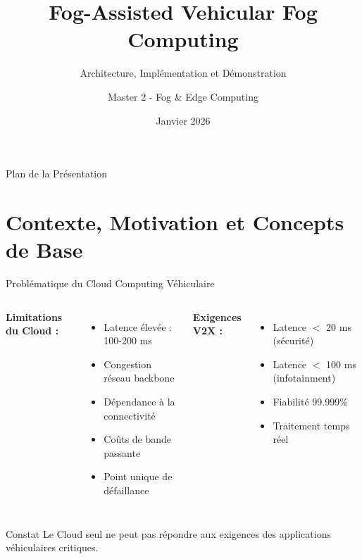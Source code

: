 ﻿\documentclass[aspectratio=169,11pt]{beamer}
\title[Fog-Assisted Vehicular Computing]{Fog-Assisted Vehicular Fog Computing}
\subtitle{Architecture, Impl\'ementation et D\'emonstration}
\author{Master 2 - Fog \& Edge Computing}
\institute{Universit\'e}
\date{Janvier 2026}
\begin{document}
\begin{frame}
\titlepage
\end{frame}

\begin{frame}{Plan de la Pr\'esentation}
\tableofcontents
\end{frame}

\section{Contexte, Motivation et Concepts de Base}

\begin{frame}{Probl\'ematique du Cloud Computing V\'ehiculaire}
\begin{columns}
\textbf{Limitations du Cloud :}
\begin{itemize}
    \item \textcolor{fogred}{Latence \'elev\'ee} : 100-200 ms
    \item Congestion r\'eseau backbone
    \item D\'ependance \`a la connectivit\'e
    \item Co\^uts de bande passante
    \item Point unique de d\'efaillance
\end{itemize}

\textbf{Exigences V2X :}
\begin{itemize}
    \item Latence $<$ 20 ms (s\'ecurit\'e)
    \item Latence $<$ 100 ms (infotainment)
    \item Fiabilit\'e 99.999\%
    \item Traitement temps r\'eel
\end{itemize}
\end{columns}

\vspace{0.5cm}
\begin{alertblock}{Constat}
Le Cloud seul ne peut pas r\'epondre aux exigences des applications v\'ehiculaires critiques.
\end{alertblock}
\end{frame}
\end{document}
